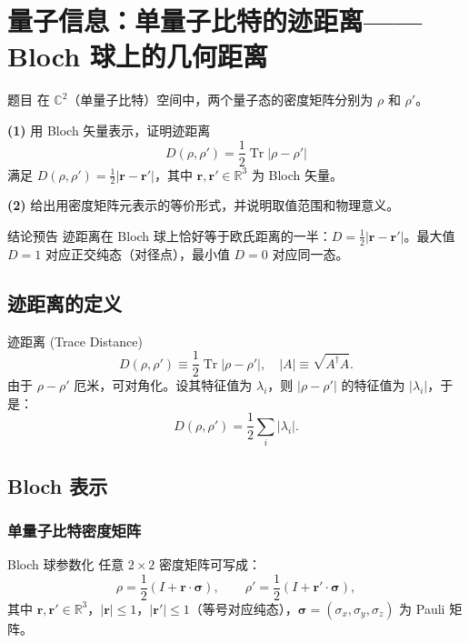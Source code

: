 \section{量子信息：单量子比特的迹距离——Bloch 球上的几何距离}

\begin{modelbox}{题目}
在 $\mathbb{C}^2$（单量子比特）空间中，两个量子态的密度矩阵分别为 $\rho$ 和 $\rho'$。

\textbf{(1)} 用 Bloch 矢量表示，证明迹距离
\[
  D(\rho,\rho') = \frac12\operatorname{Tr}|\rho-\rho'|
\]
满足 $D(\rho,\rho') = \frac12|\bm r - \bm r'|$，其中 $\bm r, \bm r' \in \mathbb{R}^3$ 为 Bloch 矢量。

\textbf{(2)} 给出用密度矩阵元表示的等价形式，并说明取值范围和物理意义。
\end{modelbox}

\vspace{0.3em}
\begin{insightbox}{结论预告}
迹距离在 Bloch 球上恰好等于欧氏距离的一半：$D = \frac12|\bm r - \bm r'|$。最大值 $D=1$ 对应正交纯态（对径点），最小值 $D=0$ 对应同一态。
\end{insightbox}


\subsection{迹距离的定义}

\begin{modelbox}{迹距离 (Trace Distance)}
\[
  D(\rho,\rho') \equiv \frac12\operatorname{Tr}|\rho-\rho'|,
  \quad |A| \equiv \sqrt{A^\dagger A}.
\]
由于 $\rho-\rho'$ 厄米，可对角化。设其特征值为 $\lambda_i$，则 $|\rho-\rho'|$ 的特征值为 $|\lambda_i|$，于是：
\[
  D(\rho,\rho') = \frac12\sum_i |\lambda_i|.
\]
\end{modelbox}


\subsection{Bloch 表示}

\subsubsection{单量子比特密度矩阵}

\begin{tipbox}{Bloch 球参数化}
任意 $2\times 2$ 密度矩阵可写成：
\[
  \rho = \frac12(I + \bm r\cdot\bm\sigma), \qquad
  \rho' = \frac12(I + \bm r'\cdot\bm\sigma),
\]
其中 $\bm r, \bm r' \in \mathbb{R}^3$，$|\bm r| \le 1$，$|\bm r'| \le 1$（等号对应纯态），$\bm\sigma=(\sigma_x,\sigma_y,\sigma_z)$ 为 Pauli 矩阵。
\end{tipbox}

